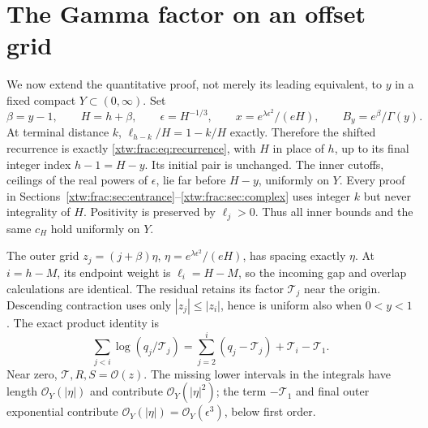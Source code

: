 \documentclass[11pt]{article}
\theoremstyle{remark}\newtheorem{remark}[theorem]{Remark}
\newcommand{\OO}{\mathcal O}
\newcommand{\TT}{\mathcal T}
\begin{document}
\section{The Gamma factor on an offset grid}\label{xtw:frac:sec:offset}
We now extend the quantitative proof, not merely its leading equivalent,
to $y$ in a fixed compact $Y\subset(0,\infty)$. Set
\[
 \beta=y-1,\qquad H=h+\beta,\qquad \epsilon=H^{-1/3},\qquad
 x=e^{\lambda\epsilon^2}/(eH),\qquad B_y=e^\beta/\Gamma(y).
\]
At terminal distance $k$, $\ell_{h-k}/H=1-k/H$ exactly. Therefore the
shifted recurrence is exactly \eqref{xtw:frac:eq:recurrence}, with $H$ in place of
$h$, up to its final integer index $h-1=H-y$. Its initial pair is unchanged.
The inner cutoffs, ceilings of the real powers of $\epsilon$, lie far
before $H-y$, uniformly on $Y$. Every proof in
Sections~\ref{xtw:frac:sec:entrance}--\ref{xtw:frac:sec:complex} uses integer $k$ but never
integrality of $H$. Positivity is preserved by $\ell_j>0$. Thus all inner
bounds and the same $c_H$ hold uniformly on $Y$.

The outer grid $z_j=(j+\beta)\eta$, $\eta=e^{\lambda\epsilon^2}/(eH)$,
has spacing exactly $\eta$. At $i=h-M$, its endpoint weight is
$\ell_i=H-M$, so the incoming gap and overlap calculations are identical.
The residual retains its factor $\TT_j$ near the origin. Descending
contraction uses only $|z_j|\le|z_i|$, hence is uniform also when $0<y<1$.
The exact product identity is
\[
 \sum_{j<i}\log(q_j/\TT_j)
       =\sum_{j=2}^i(q_j-\TT_j)+\TT_i-\TT_1.
\]
Near zero, $\TT,R,S=\OO(z)$. The missing lower intervals in the integrals
have length $\OO_Y(|\eta|)$ and contribute $\OO_Y(|\eta|^2)$;
the term $-\TT_1$ and final outer exponential contribute
$\OO_Y(|\eta|)=\OO_Y(\epsilon^3)$, below first order.
\end{document}
